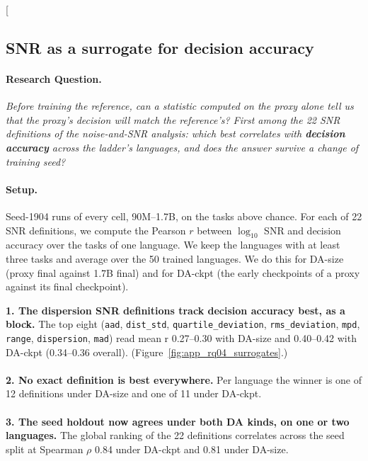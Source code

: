 \clearpage
\twocolumn[{%
\subsection{SNR as a surrogate for decision accuracy}
\label{app:rq04_surrogates}

\noindent\begin{minipage}[t]{0.485\textwidth}
\vspace{0pt}
\paragraph{Research Question.} \emph{Before training the reference, can a statistic computed on the proxy alone tell us that the proxy's decision will match the reference's? First among the 22 SNR definitions of the noise-and-SNR analysis: which best correlates with \textbf{decision accuracy} across the ladder's languages, and does the answer survive a change of training seed?}

\paragraph{Setup.} Seed-1904 runs of every cell, 90M--1.7B, on the tasks above chance. For each of 22 SNR definitions, we compute the Pearson $r$ between $\log_{10}$ SNR and decision accuracy over the tasks of one language. We keep the languages with at least three tasks and average over the 50 trained languages. We do this for DA-size (proxy final against 1.7B final) and for DA-ckpt (the early checkpoints of a proxy against its final checkpoint).
\end{minipage}\hfill
\begin{minipage}[t]{0.485\textwidth}
\vspace{0pt}
\begin{rqfinding}
\textbf{1. The dispersion SNR definitions track decision accuracy best, as a block.} The top eight (\texttt{aad}, \texttt{dist\_std}, \texttt{quartile\_deviation}, \texttt{rms\_deviation}, \texttt{mpd}, \texttt{range}, \texttt{dispersion}, \texttt{mad}) read mean r 0.27--0.30 with DA-size and 0.40--0.42 with DA-ckpt (0.34--0.36 overall). (Figure~\ref{fig:app_rq04_surrogates}.)
\\
\\
\textbf{2. No exact definition is best everywhere.} Per language the winner is one of 12 definitions under DA-size and one of 11 under DA-ckpt.
\\
\\
\textbf{3. The seed holdout now agrees under both DA kinds, on one or two languages.} The global ranking of the 22 definitions correlates across the seed split at Spearman $\rho$ 0.84 under DA-ckpt and 0.81 under DA-size.
\end{rqfinding}
\end{minipage}

}
